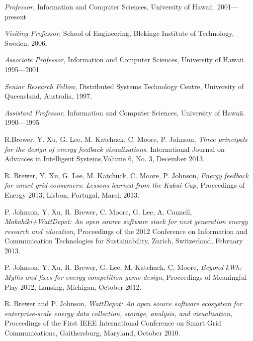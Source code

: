 \begin{Appointments}
\item {\em Professor},  Information and Computer
  Sciences, University of Hawaii.  2001---present

\item {\em Visiting Professor}, School of Engineering, Blekinge Institute of Technology, Sweden, 2006.

\item {\em Associate Professor},  Information and Computer
  Sciences, University of Hawaii.  1995---2001

\item {\em Senior Research Fellow},  Distributed Systems Technology Centre,
University of Queensland, Australia, 1997.

\item {\em Assistant Professor},   Information and Computer
  Sciences, University of Hawaii.  1990---1995

\end{Appointments}




\begin{Products: Closely Related}

\item R.Brewer, Y. Xu, G. Lee, M. Katchuck, C. Moore, P. Johnson, {\em Three principals for the design of energy feedback visualizations}, International Journal on Advances in Intelligent Systems,Volume 6, No. 3, December 2013.


\item R. Brewer, Y. Xu, G. Lee, M. Katchuck, C. Moore, P. Johnson, {\em Energy feedback for smart grid consumers: Lessons learned from the Kukui Cup}, Proceedings of Energy 2013, Lisbon, Portugal, March 2013.


\item P. Johnson, Y. Xu, R. Brewer,  C. Moore,  G. Lee, A. Connell, {\em Makahiki+WattDepot: An open source software stack for next generation energy research and education}, Proceedings of the 2012 Conference on Information and Communication Technologies for Sustainability, Zurich, Switzerland, February 2013.

\item P. Johnson, Y. Xu, R. Brewer, G. Lee, M. Katchuck, C. Moore, {\em Beyond kWh: Myths and fixes for energy competition game design}, Proceedings of Meaningful Play 2012, Lansing, Michigan, October 2012.

\item R. Brewer and P. Johnson, {\em WattDepot: An open source software ecosystem for enterprise-scale energy data collection, storage, analysis, and visualization}, Proceedings of the First IEEE International Conference on Smart Grid Communications, Gaithersburg, Maryland, October 2010.


\end{Products: Closely Related}


